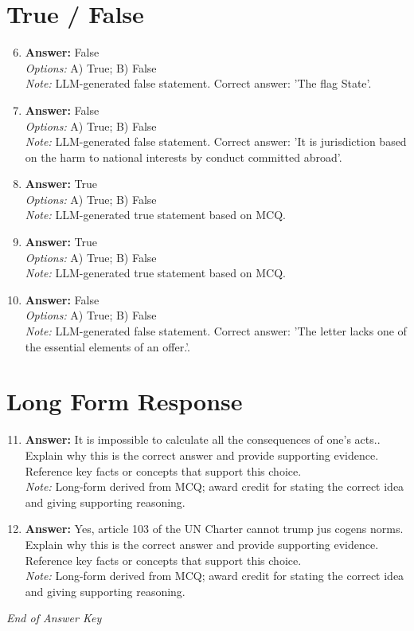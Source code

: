 \documentclass[12pt]{article}
\begin{document}
\section*{True / False}
\begin{enumerate}[label=\arabic*.]
\setcounter{enumi}{5}
\item \textbf{Answer:} False
\\ \textit{Options:} A) True; B) False
\\ \textit{Note:} LLM-generated false statement. Correct answer: 'The flag State'.
\item \textbf{Answer:} False
\\ \textit{Options:} A) True; B) False
\\ \textit{Note:} LLM-generated false statement. Correct answer: 'It is jurisdiction based on the harm to national interests by conduct committed abroad'.
\item \textbf{Answer:} True
\\ \textit{Options:} A) True; B) False
\\ \textit{Note:} LLM-generated true statement based on MCQ.
\item \textbf{Answer:} True
\\ \textit{Options:} A) True; B) False
\\ \textit{Note:} LLM-generated true statement based on MCQ.
\item \textbf{Answer:} False
\\ \textit{Options:} A) True; B) False
\\ \textit{Note:} LLM-generated false statement. Correct answer: 'The letter lacks one of the essential elements of an offer.'.
\end{enumerate}

\section*{Long Form Response}
\begin{enumerate}[label=\arabic*.]
\setcounter{enumi}{10}
\item \textbf{Answer:} It is impossible to calculate all the consequences of one's acts.. Explain why this is the correct answer and provide supporting evidence. Reference key facts or concepts that support this choice.
\\ \textit{Note:} Long-form derived from MCQ; award credit for stating the correct idea and giving supporting reasoning.
\item \textbf{Answer:} Yes, article 103 of the UN Charter cannot trump jus cogens norms. Explain why this is the correct answer and provide supporting evidence. Reference key facts or concepts that support this choice.
\\ \textit{Note:} Long-form derived from MCQ; award credit for stating the correct idea and giving supporting reasoning.
\end{enumerate}

\vfill
\noindent\textit{End of Answer Key}
\end{document}
